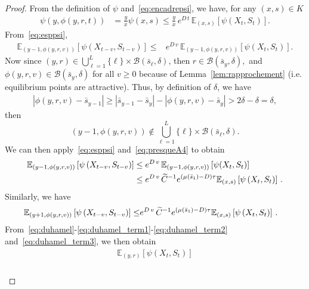 \documentclass[10pt]{amsart}
\theoremstyle{definition}\newtheorem{defi}[theo]{Definition}\newtheorem{rema}[theo]{Remark}\newtheorem{exam}[theo]{Example}\newtheorem{exem}[theo]{Example}\newtheorem{nota}[theo]{Notation}
\newcommand{\EE}{\mathbb{E}}
\newcommand{\clB}{\mathcal{B}}
\newcommand{\barmu}{\mu(\bar s_1)}
\newcommand{\1}{\mathbf{1}}
\let\oldtilde\tilde
\renewcommand*{\tilde}[1]{\mathchoice{\widetilde{#1}}{\widetilde{#1}}{\oldtilde{#1}}{\oldtilde{#1}}}
\begin{document}
\begin{proof}
From the definition of $\psi$ and~\eqref{eq:encadrepsi}, we have, for any $(x,s)\in K$
\begin{align}\label{eq:duhamel_term1}
\psi\left(y, \phi(y,r,t)\right) &= \frac{y}{x} \psi\left(x, s\right)
\leq \frac{y}{x}\,e^{D \,t} \, \EE_{(x,s)} \left[\psi (X_t, S_t)\right].
\end{align}
From~\eqref{eq:esppsi},
\begin{align*}
\EE_{\left(y-1, \phi(y,r,v)\right)} \left[\psi (X_{t-v}, S_{t-v})\right]
\leq & e^{D\,v}\,\EE_{\left(y-1, \phi(y,r,v)\right)} \left[\psi (X_{t}, S_{t})\right].
\end{align*}
Now since $(y, r) \in \bigcup_{\ell=1}^L \{\ell\} \times \clB(\bar s_\ell, \delta)$, then $r \in \clB(\bar s_y, \delta),$ and $\phi(y,r,v) \in \clB(\bar s_y, \delta)$ for all $v\geq 0$ because of Lemma~\ref{lem:rapprochement} (i.e. equilibrium points are attractive). Thus, by definition of $\delta$, we have
\begin{align*}
\left|\phi(y,r,v)- \bar s_{y-1} \right|
\geq \left|\bar s_{y-1}- \bar s_y \right| - \left|\phi(y,r,v) - \bar s_{y} \right| > 2\delta - \delta=\delta,
\end{align*}
then
\[
(y-1, \phi(y,r,v)) \notin \bigcup_{\ell=1}^L \{\ell\} \times\clB(\bar s_\ell, \delta).
\]
We can then apply~\eqref{eq:esppsi} and~\eqref{eq:presqueA4} to obtain
\begin{equation}\label{eq:duhamel_term2}
\begin{split}
\EE_{\left(y-1, \phi(y,r,v)\right)} \left[\psi \left(X_{t-v}, S_{t-v}\right)\right] & \leq e^{D\,v}\,\EE_{(y-1, \phi(y,r,v))} \left[\psi (X_t, S_t)\right] \\
& \leq e^{D\,v}\,\tilde C^{-1} e^{(\barmu-D) \tau} \EE_{(x,s)} \left[\psi \left(X_{t}, S_{t}\right)\right] \,.
\end{split}
\end{equation}
Similarly, we have
\begin{align}\label{eq:duhamel_term3}
\EE_{\left(y+1, \phi(y,r,v)\right)} \left[\psi \left(X_{t-v}, S_{t-v}\right)\right]
\leq & e^{D\,v}\, \tilde C^{-1} e^{(\barmu-D) \tau} \EE_{(x,s)} \left[\psi \left(X_{t}, S_{t}\right)\right] \,.
\end{align}
From~\eqref{eq:duhamel}-\eqref{eq:duhamel_term1}-\eqref{eq:duhamel_term2} and~\eqref{eq:duhamel_term3}, we then obtain
\begin{multline*}
\EE_{(y,r)} \left[\psi \left(X_t, S_t\right)\right]\\
\begin{aligned}

\end{aligned}
\end{multline*}
\end{proof}
\end{document}
